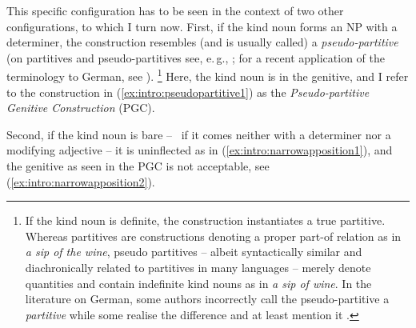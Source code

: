 \begin{exe}
  \ex\label{ex:intro:alternation}
  \begin{xlist}
  \end{xlist}
\end{exe}

This specific configuration has to be seen in the context of two other configurations, to which I turn now.
First, if the kind noun forms an NP with a determiner, the construction resembles (and is usually called) a \textit{pseudo-partitive} (on partitives and pseudo-partitives see, e.\,g., \citealp{Barker1998,Selkirk1977,Stickney2007,Vos1999}; for a recent application of the terminology to German, see \citealp{Gerstenberger2015}).%
\footnote{If the kind noun is definite, the construction instantiates a true partitive.
Whereas partitives are constructions denoting a proper part-of relation as in \textit{a sip of the wine}, pseudo partitives -- albeit syntactically similar and diachronically related to partitives in many languages -- merely denote quantities and contain indefinite kind nouns as in \textit{a sip of wine}.
In the literature on German, some authors incorrectly call the pseudo-partitive a \textit{partitive} \citep{Hentschel1993} while some realise the difference and at least mention it \citep{Eschenbach1994,GallmannLindauer1994,Loebel1989,Zimmer2015}.
}
Here, the kind noun is in the genitive, and I refer to the construction in (\ref{ex:intro:pseudopartitive1}) as the \textit{Pseudo-partitive Genitive Construction} (PGC).

\begin{exe}
\end{exe}

Second, if the kind noun is bare -- \ie\ if it comes neither with a determiner nor a modifying adjective -- it is uninflected as in (\ref{ex:intro:narrowapposition1}), and the genitive as seen in the PGC is not acceptable, see (\ref{ex:intro:narrowapposition2}).

